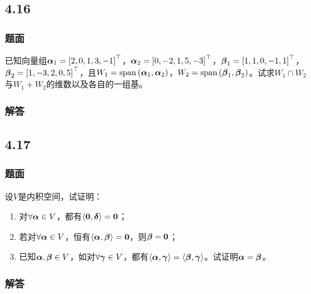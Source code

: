 \documentclass{beamer}
\begin{document}
\subsection*{4.16}
\begin{frame}
    \frametitle{题面}

    已知向量组\(\boldsymbol{\alpha}_1=\left[ 2,0,1,3,-1 \right]^\top\)，\(\boldsymbol{\alpha}_2=\left[ 0,-2,1,5,-3 \right]^\top\)，\(\boldsymbol{\beta}_1=\left[ 1,1,0,-1,1 \right]^\top\)，\(\boldsymbol{\beta}_2=\left[ 1,-3,2,0,5 \right]^\top\)，且\(W_1=\mathrm{span}\left( \boldsymbol{\alpha}_1,\boldsymbol{\alpha}_2 \right)\)，\(W_2=\mathrm{span}\left( \boldsymbol{\beta}_1,\boldsymbol{\beta}_2 \right)\)。试求\(W_1\cap W_2\)与\(W_1+W_2\)的维数以及各自的一组基。

\end{frame}

\begin{frame}
    \frametitle{解答}



\end{frame}

\subsection*{4.17}
\begin{frame}
    \frametitle{题面}

    设\(V\)是内积空间，试证明：
    \begin{enumerate}
        \item 对\(\forall\boldsymbol{\alpha}\in V\)，都有\(\left\langle \boldsymbol{0},\boldsymbol{\delta} \right\rangle=\boldsymbol{0}\)；
        \item 若对\(\forall\boldsymbol{\alpha}\in V\)，恒有\(\left\langle \boldsymbol{\alpha},\boldsymbol{\beta} \right\rangle=\boldsymbol{0}\)，则\(\boldsymbol{\beta}=\boldsymbol{0}\)；
        \item 已知\(\boldsymbol{\alpha},\boldsymbol{\beta}\in V\)，如对\(\forall\boldsymbol{\gamma}\in V\)，都有\(\left\langle \boldsymbol{\alpha},\boldsymbol{\gamma} \right\rangle=\left\langle \boldsymbol{\beta},\boldsymbol{\gamma} \right\rangle\)。试证明\(\boldsymbol{\alpha}=\boldsymbol{\beta}\)。
    \end{enumerate}

\end{frame}

\begin{frame}
    \frametitle{解答}



\end{frame}
\end{document}
